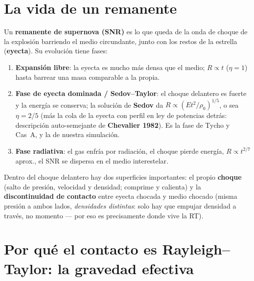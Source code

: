 \documentclass[11pt,a4paper]{article}
\newcommand{\term}[1]{\textbf{#1}}
\begin{document}
\section{La vida de un remanente}

Un \term{remanente de supernova (SNR)} es lo que queda de la onda de choque de la
explosión barriendo el medio circundante, junto con los restos de la estrella
(\term{eyecta}). Su evolución tiene fases:
\begin{enumerate}[nosep]
  \item \term{Expansión libre}: la eyecta es mucho más densa que el medio; $R\propto t$
  ($\eta=1$) hasta barrear una masa comparable a la propia.
  \item \term{Fase de eyecta dominada / Sedov--Taylor}: el choque delantero es fuerte y
  la energía se conserva; la solución de \term{Sedov} da
  $R\propto (Et^2/\rho_0)^{1/5}$, o sea $\eta=2/5$ (más la cola de la eyecta con perfil
  en ley de potencias detrás: descripción auto-semejante de \term{Chevalier 1982}). Es la
  fase de Tycho y Cas~A, y la de nuestra simulación.
  \item \term{Fase radiativa}: el gas enfría por radiación, el choque pierde energía,
  $R\propto t^{2/7}$ aprox., el SNR se dispersa en el medio interestelar.
\end{enumerate}
Dentro del choque delantero hay dos superficies importantes: el propio \term{choque}
(salto de presión, velocidad y densidad; comprime y calienta) y la \term{discontinuidad
de contacto} entre eyecta chocada y medio chocado (misma presión a ambos lados,
\emph{densidades distintas}: solo hay que empujar densidad a través, no momento --- por eso
es precisamente donde vive la RT).

\section{Por qué el contacto es Rayleigh--Taylor: la gravedad efectiva}
\end{document}
